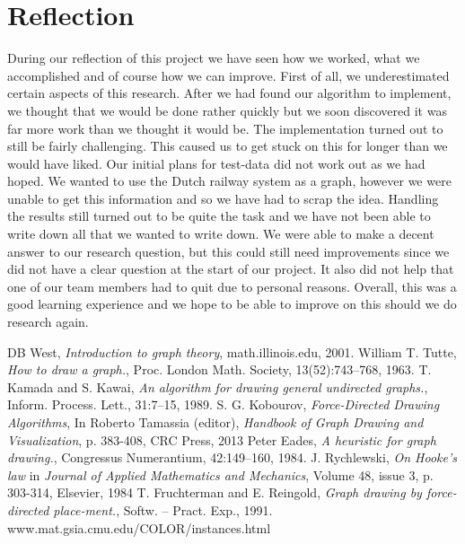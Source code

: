 \documentclass[a4paper,12pt]{article}
\begin{document}
\section{Reflection}
During our reflection of this project we have seen how we worked, what we accomplished and of course how we can improve. First of all, we underestimated certain aspects of this research. After we had found our algorithm to implement, we thought that we would be done rather quickly but we soon discovered it was far more work than we thought it would be. The implementation turned out to still be fairly challenging. This caused us to get stuck on this for longer than we would have liked. Our initial plans for test-data did not work out as we had hoped. We wanted to use the Dutch railway system as a graph, however we were unable to get this information and so we have had to scrap the idea. Handling the results still turned out to be quite the task and we have not been able to write down all that we wanted to write down. We were able to make a decent answer to our research question, but this could still need improvements since we did not have a clear question at the start of our project. It also did not help that one of our team members had to quit due to personal reasons. Overall, this was a good learning experience and we hope to be able to improve on this should we do research again.


\begin{thebibliography}{99}
DB West, \emph{Introduction to graph theory}, math.illinois.edu, 2001.
William T. Tutte, \emph{How to draw a graph.}, Proc. London Math. Society, 13(52):743–768, 1963.
T. Kamada and S. Kawai, \emph{An algorithm for drawing general undirected graphs.}, Inform. Process. Lett., 31:7–15, 1989.
S. G. Kobourov, \emph{Force-Directed Drawing Algorithms}, In Roberto Tamassia (editor), \emph{Handbook of Graph Drawing and Visualization}, p. 383-408, CRC Press, 2013
 Peter Eades, \emph{A heuristic for graph drawing.}, Congressus Numerantium, 42:149–160, 1984.
 J. Rychlewski, \emph{On Hooke's law} in \emph{Journal of Applied Mathematics and Mechanics}, Volume 48, issue 3, p. 303-314, Elsevier, 1984
T. Fruchterman and E. Reingold, \emph{Graph drawing by force-directed place-ment.}, Softw. – Pract. Exp., 1991.
 www.mat.gsia.cmu.edu/COLOR/instances.html
\end{thebibliography}
\end{document}
